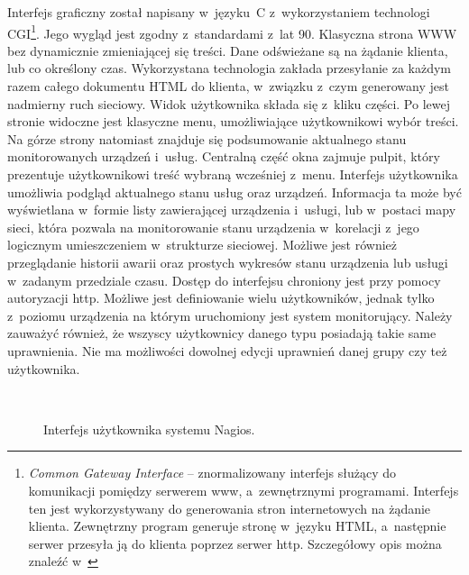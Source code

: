 Interfejs graficzny został napisany w~języku~C z~wykorzystaniem
technologi CGI\footnote{{\em Common Gateway Interface} --
  znormalizowany interfejs służący do komunikacji pomiędzy serwerem
  www, a~zewnętrznymi programami. Interfejs ten jest wykorzystywany do
  generowania stron internetowych na żądanie klienta. Zewnętrzny
  program generuje stronę w~języku HTML, a~następnie serwer przesyła
  ją do klienta poprzez serwer http. Szczegółowy opis można znaleźć
  w~\cite{www:CGI}}. Jego wygląd jest zgodny z~standardami z~lat
90. Klasyczna strona WWW bez dynamicznie zmieniającej się treści. Dane
odświeżane są na żądanie klienta, lub co określony czas. Wykorzystana
technologia zakłada przesyłanie za każdym razem całego dokumentu HTML
do klienta, w~związku z~czym generowany jest nadmierny ruch
sieciowy. Widok użytkownika składa się z~kliku części. Po lewej
stronie widoczne jest klasyczne menu, umożliwiające użytkownikowi
wybór treści. Na górze strony natomiast znajduje się podsumowanie
aktualnego stanu monitorowanych urządzeń i~usług. Centralną część okna
zajmuje pulpit, który prezentuje użytkownikowi treść wybraną wcześniej
z~menu. Interfejs użytkownika umożliwia podgląd aktualnego stanu usług
oraz urządzeń. Informacja ta może być wyświetlana w~formie listy
zawierającej urządzenia i~usługi, lub w~postaci mapy sieci, która
pozwala na monitorowanie stanu urządzenia w~korelacji z~jego logicznym
umieszczeniem w~strukturze sieciowej. Możliwe jest również
przeglądanie historii awarii oraz prostych wykresów stanu urządzenia
lub usługi w~zadanym przedziale czasu. Dostęp do interfejsu chroniony
jest przy pomocy autoryzacji http. Możliwe jest definiowanie wielu
użytkowników, jednak tylko z~poziomu urządzenia na którym uruchomiony
jest system monitorujący. Należy zauważyć również, że wszyscy
użytkownicy danego typu posiadają takie same uprawnienia. Nie ma
możliwości dowolnej edycji uprawnień danej grupy czy też użytkownika.

\begin{figure}[h]
\label{fig:NagiosInterface}
\caption{Interfejs użytkownika systemu Nagios.}
\begin{center}
\\[0.1cm]
\end{center}
\end{figure}

